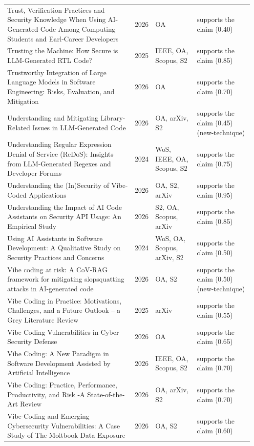 \begin{longtable}{@{}%
  >{\raggedright\arraybackslash}p{}c%
  >{\raggedright\arraybackslash}p{}%
  >{\raggedright\arraybackslash}p{}@{}}
Trust, Verification Practices and Security Knowledge When Using AI-Generated Code Among Computing Students and Earl-Career Developers & 2026 & OA & supports the claim (0.40) \\
Trusting the Machine: How Secure is LLM-Generated RTL Code? & 2025 & IEEE, OA, Scopus, S2 & supports the claim (0.85) \\
Trustworthy Integration of Large Language Models in Software Engineering: Risks, Evaluation, and Mitigation & 2026 & OA & supports the claim (0.70) \\
Understanding and Mitigating Library-Related Issues in LLM-Generated Code & 2026 & OA, arXiv, S2 & supports the claim (0.45) (new-technique) \\
Understanding Regular Expression Denial of Service (ReDoS): Insights from LLM-Generated Regexes and Developer Forums & 2024 & WoS, IEEE, OA, Scopus, S2 & supports the claim (0.75) \\
Understanding the (In)Security of Vibe-Coded Applications & 2026 & OA, S2, arXiv & supports the claim (0.95) \\
Understanding the Impact of AI Code Assistants on Security API Usage: An Empirical Study & 2026 & S2, OA, Scopus, arXiv & supports the claim (0.85) \\
Using AI Assistants in Software Development: A Qualitative Study on Security Practices and Concerns & 2024 & WoS, OA, Scopus, arXiv, S2 & supports the claim (0.50) \\
Vibe coding at risk: A CoV-RAG framework for mitigating slopsquatting attacks in AI-generated code & 2026 & OA, S2 & supports the claim (0.50) (new-technique) \\
Vibe Coding in Practice: Motivations, Challenges, and a Future Outlook -- a Grey Literature Review & 2025 & arXiv & supports the claim (0.55) \\
Vibe Coding Vulnerabilities in Cyber Security Defense & 2026 & OA & supports the claim (0.65) \\
Vibe Coding: A New Paradigm in Software Development Assisted by Artificial Intelligence & 2026 & IEEE, OA, Scopus, S2 & supports the claim (0.70) \\
Vibe Coding: Practice, Performance, Productivity, and Risk -A State-of-the-Art Review & 2026 & OA, arXiv, S2 & supports the claim (0.70) \\
Vibe-Coding and Emerging Cybersecurity Vulnerabilities: A Case Study of The Moltbook Data Exposure & 2026 & OA, S2 & supports the claim (0.60) \\

\end{longtable}
